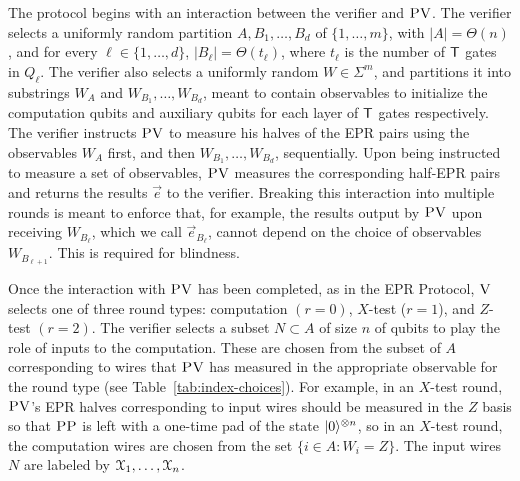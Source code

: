 The protocol begins with an interaction between the verifier and $\textsc{PV}$. The verifier selects a uniformly random partition $A,B_1,\dots,B_d$ of $\{1,\dots,m\}$, with $|A|=\Theta(n)$, and for every $\ell\in\{1,\dots,d\}$, $|B_{\ell}|=\Theta(t_\ell)$, where $t_{\ell}$ is the number of $\sf T$ gates in $Q_\ell$. The verifier also selects a uniformly random $W\in\Sigma^m$, and partitions it into substrings $W_A$ and $W_{B_1},\ldots,W_{B_d}$, meant to contain observables to initialize the computation qubits and auxiliary qubits for each layer of ${\sf T}$ gates respectively. The verifier instructs $\textsc{PV}$ to measure his halves of the EPR pairs using the observables $W_A$ first, and then $W_{B_1},\ldots,W_{B_d}$, sequentially. Upon being instructed to measure a set of observables, $\textsc{PV}$ measures the corresponding half-EPR pairs and returns the results $\vec{e}$ to the verifier. Breaking this interaction into multiple rounds is meant to enforce that, for example, the results output by $\textsc{PV}$ upon receiving $W_{B_{\ell}}$, which we call $\vec{e}_{B_{\ell}}$, cannot depend on the choice of observables $W_{B_{\ell+1}}$. This is required for blindness. 

Once the interaction with $\textsc{PV}$ has been completed, as in the EPR Protocol, $\textsc{V}$ selects one of three round types: computation $(r=0)$, $X$-test ($r=1$), and $Z$-test $(r=2)$. 
The verifier selects a subset $N\subset A$ of size $n$ of qubits to play the role of inputs to the computation. These are chosen from the subset of $A$ corresponding to wires that $\textsc{PV}$ has measured in the appropriate observable for the round type (see Table~\ref{tab:index-choices}). For example, in an $X$-test round, $\textsc{PV}$'s EPR halves corresponding to input wires should be measured in the $Z$ basis so that $\textsc{PP}$ is left with a one-time pad of the state $|0\rangle^{\otimes n}$, so in an $X$-test round, the computation wires are chosen from the set $\{i\in A:W_i=Z\}$. The input wires $N$ are labeled by ${\cal X}_1,\dots,{\cal X}_n$. 




